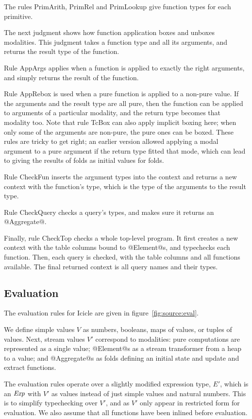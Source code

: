 The rules PrimArith, PrimRel and PrimLookup give function types for each primitive.

The next judgment shows how function application boxes and unboxes modalities.
This judgment takes a function type and all its arguments, and returns the result type of the function.

Rule AppArgs applies when a function is applied to exactly the right arguments, and simply returns the result of the function.

Rule AppRebox is used when a pure function is applied to a non-pure value.
If the arguments and the result type are all pure, then the function can be applied to arguments of a particular modality, and the return type becomes that modality too.
Note that rule TcBox can also apply implicit boxing here; when only some of the arguments are non-pure, the pure ones can be boxed.
These rules are tricky to get right; an earlier version allowed applying a modal argument to a pure argument if the return type fitted that mode, which can lead to giving the results of folds as initial values for folds.



Rule CheckFun inserts the argument types into the context and returns a new context with the function's type, which is the type of the arguments to the result type.

Rule CheckQuery checks a query's types, and makes sure it returns an @Aggregate@.

Finally, rule CheckTop checks a whole top-level program.
It first creates a new context with the table columns bound to @Element@s, and typechecks each function.
Then, each query is checked, with the table columns and all functions available.
The final returned context is all query names and their types.

\subsection{Evaluation}

The evaluation rules for Icicle are given in figure~\ref{fig:source:eval}.

We define simple values $V$ as numbers, booleans, maps of values, or tuples of values.
Next, stream values $V'$ correspond to modalities: pure computations are represented as a single value;
@Element@s as a stream transformer from a heap to a value;
and @Aggregate@s as folds defining an initial state and update and extract functions.

The evaluation rules operate over a slightly modified expression type, $E'$, which is an $\mathit{Exp}$ with $V'$ as values instead of just simple values and natural numbers.
This is to simplify typechecking over $V'$, and as $V'$ only appear in restricted form for evaluation.
We also assume that all functions have been inlined before evaluation.

